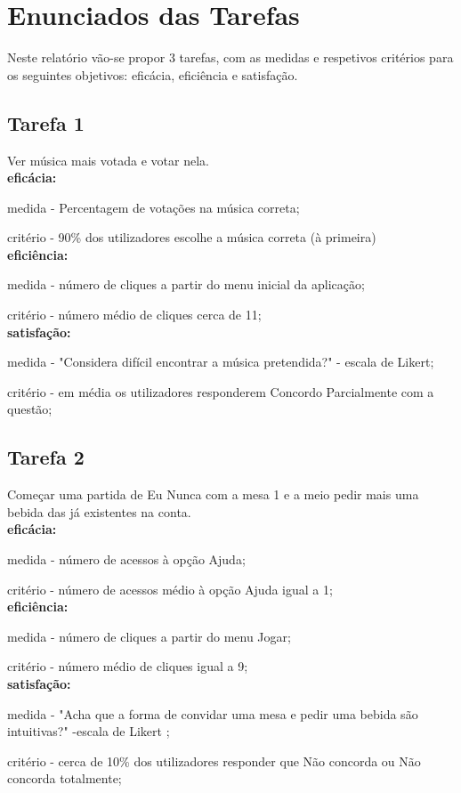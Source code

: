 \documentclass{article}
\begin{document}
\section*{Enunciados das Tarefas}
Neste relatório vão-se propor 3 tarefas, com as medidas e respetivos critérios para os seguintes objetivos: eficácia, eficiência e satisfação.

\subsection*{Tarefa 1}
Ver música mais votada e votar nela.\\
\textbf{eficácia:} 

medida - Percentagem de votações na música correta;

critério - 90\% dos utilizadores escolhe a música correta (à primeira)\\
\textbf{eficiência:} 

medida - número de cliques a partir do menu inicial da aplicação;
 
critério - número médio de cliques cerca de 11;\\
\textbf{satisfação:}

medida - "Considera difícil encontrar a música pretendida?" - escala de Likert;

critério - em média os utilizadores responderem Concordo Parcialmente com a questão;

\subsection*{Tarefa 2}
 Começar uma partida de Eu Nunca com a mesa 1 e a meio pedir mais uma bebida das já existentes na conta.\\
\textbf{eficácia:}

medida - número de acessos à opção Ajuda;

critério - número de acessos médio à opção Ajuda igual a 1;\\
\textbf{eficiência:}

medida - número de cliques a partir do menu Jogar;

critério - número médio de cliques igual a 9;\\
\textbf{satisfação:}

medida - "Acha que a forma de convidar uma mesa e pedir uma bebida são intuitivas?" -escala de Likert ;

critério - cerca de 10\% dos utilizadores responder que Não concorda ou Não concorda totalmente;
\end{document}
